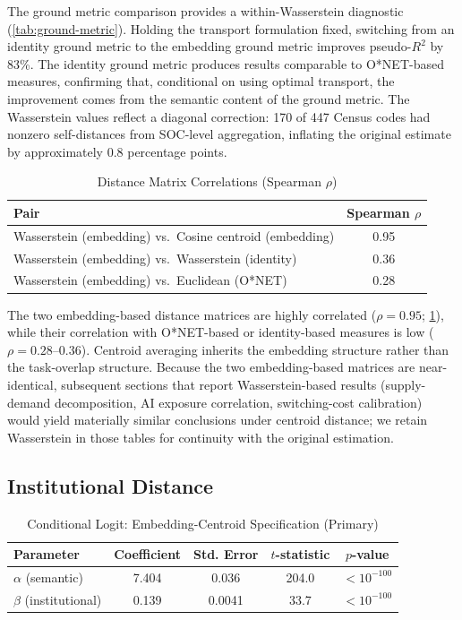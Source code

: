 \documentclass[12pt]{article}
\begin{document}
The ground metric comparison provides a within-Wasserstein diagnostic (\cref{tab:ground-metric}). Holding the transport formulation fixed, switching from an identity ground metric to the embedding ground metric improves pseudo-$R^2$ by 83\%. The identity ground metric produces results comparable to O*NET-based measures, confirming that, conditional on using optimal transport, the improvement comes from the semantic content of the ground metric. The Wasserstein values reflect a diagonal correction: 170 of 447 Census codes had nonzero self-distances from SOC-level aggregation, inflating the original estimate by approximately 0.8 percentage points.


\begin{table}[h!]
\centering
\caption{Distance Matrix Correlations (Spearman $\rho$)}
\label{tab:distance-correlations}
\begin{tabular}{lc}
\toprule
\textbf{Pair} & \textbf{Spearman $\rho$} \\
\midrule
Wasserstein (embedding) vs.\ Cosine centroid (embedding) & 0.95 \\
Wasserstein (embedding) vs.\ Wasserstein (identity) & 0.36 \\
Wasserstein (embedding) vs.\ Euclidean (O*NET) & 0.28 \\
\bottomrule
\end{tabular}
\end{table}


The two embedding-based distance matrices are highly correlated ($\rho = 0.95$; \cref{tab:distance-correlations}), while their correlation with O*NET-based or identity-based measures is low ($\rho = 0.28$--$0.36$). Centroid averaging inherits the embedding structure rather than the task-overlap structure. Because the two embedding-based matrices are near-identical, subsequent sections that report Wasserstein-based results (supply-demand decomposition, AI exposure correlation, switching-cost calibration) would yield materially similar conclusions under centroid distance; we retain Wasserstein in those tables for continuity with the original estimation.


\subsection{Institutional Distance}
\label{subsec:cps-mobility}


\begin{table}[h!]
\centering
\caption{Conditional Logit: Embedding-Centroid Specification (Primary)}
\label{tab:clogit-centroid}
\begin{tabular}{lcccc}
\toprule
\textbf{Parameter} & \textbf{Coefficient} & \textbf{Std. Error} & \textbf{$t$-statistic} & \textbf{$p$-value} \\
\midrule
$\alpha$ (semantic) & 7.404 & 0.036 & 204.0 & $< 10^{-100}$ \\
$\beta$ (institutional) & 0.139 & 0.0041 & 33.7 & $< 10^{-100}$ \\
\bottomrule
\end{tabular}
\end{table}
\end{document}
